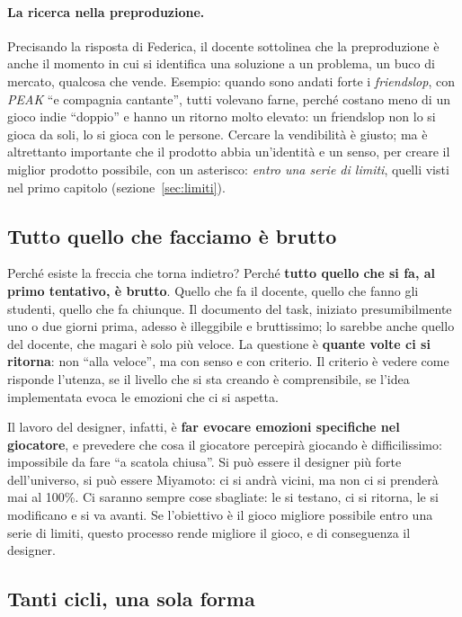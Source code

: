 \paragraph{La ricerca nella preproduzione.} Precisando la risposta di
Federica, il docente sottolinea che la preproduzione è anche il momento in cui
si identifica una soluzione a un problema, un buco di mercato, qualcosa che
vende. Esempio: quando sono andati forte i \emph{friendslop}, con
\emph{PEAK} ``e compagnia cantante'', tutti volevano farne, perché costano
meno di un gioco indie ``doppio'' e hanno un ritorno molto elevato: un
friendslop non lo si gioca da soli, lo si gioca con le persone. Cercare la
vendibilità è giusto; ma è altrettanto importante che il prodotto abbia
un'identità e un senso, per creare il miglior prodotto possibile, con un
asterisco: \emph{entro una serie di limiti}, quelli visti nel primo capitolo
(sezione~\ref{sec:limiti}).

\subsection{Tutto quello che facciamo è brutto}

Perché esiste la freccia che torna indietro? Perché \textbf{tutto quello che
si fa, al primo tentativo, è brutto}. Quello che fa il docente, quello che
fanno gli studenti, quello che fa chiunque. Il documento del task, iniziato
presumibilmente uno o due giorni prima, adesso è illeggibile e bruttissimo; lo
sarebbe anche quello del docente, che magari è solo più veloce. La questione
è \textbf{quante volte ci si ritorna}: non ``alla veloce'', ma con senso e con
criterio. Il criterio è vedere come risponde l'utenza, se il livello che si
sta creando è comprensibile, se l'idea implementata evoca le emozioni che ci
si aspetta.

Il lavoro del designer, infatti, è \textbf{far evocare emozioni specifiche nel
giocatore}, e prevedere che cosa il giocatore percepirà giocando è
difficilissimo: impossibile da fare ``a scatola chiusa''. Si può essere il
designer più forte dell'universo, si può essere Miyamoto: ci si andrà vicini,
ma non ci si prenderà mai al 100\%. Ci saranno sempre cose sbagliate: le si
testano, ci si ritorna, le si modificano e si va avanti. Se l'obiettivo è il
gioco migliore possibile entro una serie di limiti, questo processo rende
migliore il gioco, e di conseguenza il designer.

\subsection{Tanti cicli, una sola forma}

